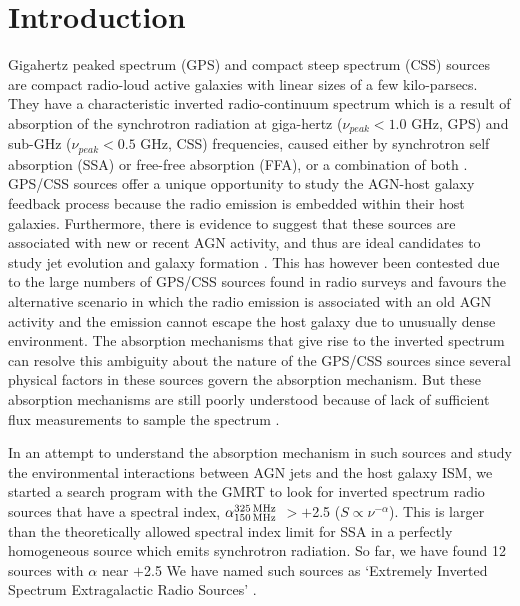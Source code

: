 \documentclass[proof]{WileyASNA-v1}
\begin{document}
\section{Introduction}\label{sec1}
Gigahertz peaked spectrum (GPS) and compact steep spectrum (CSS) sources are compact radio-loud active galaxies with linear sizes of a few kilo-parsecs. They have a characteristic inverted radio-continuum spectrum which is a result of absorption of the synchrotron radiation at giga-hertz ($\nu_{peak} < 1.0$ GHz, GPS) and sub-GHz ($\nu_{peak} < 0.5$ GHz, CSS) frequencies, caused either by synchrotron self absorption (SSA) or free-free absorption (FFA), or a combination of both \citep[e.g.,][]{Odea1998}. GPS/CSS sources offer a unique opportunity to study the AGN-host galaxy feedback process because the radio emission is embedded within their host galaxies. Furthermore, there is evidence to suggest that these sources are associated with new or recent AGN activity, and thus are ideal candidates to study jet evolution and galaxy formation \citep{Odea1998, Odea2021}. This has however been contested due to the large numbers of GPS/CSS sources found in radio surveys and favours the alternative scenario in which the radio emission is associated with an old AGN activity and the emission cannot escape the host galaxy due to unusually dense environment. The absorption mechanisms that give rise to the inverted spectrum can resolve this ambiguity about the nature of the GPS/CSS sources since several physical factors in these sources govern the absorption mechanism. But these absorption mechanisms are still poorly understood because of lack of sufficient flux measurements to sample the spectrum %
\citep{Odea1998, Callingham2017}.

In an attempt to understand the absorption mechanism in such sources and study the environmental interactions between AGN jets and the host galaxy ISM, we started a search program with the GMRT to look for inverted spectrum radio sources that have a spectral index, $\alpha^{\rm 325\, MHz}_{\rm 150\, MHz}$ $>+$2.5 ($S\propto\nu^{-\alpha}$). 
This is larger than the theoretically allowed spectral index limit for SSA in a perfectly homogeneous source which emits synchrotron radiation. So far, we have found 12 sources with $\alpha$ near $+$2.5 We have named such sources as `Extremely Inverted Spectrum Extragalactic Radio Sources' \citep[EISERS;][]{Mhaskey2019a,Mhaskey2019b, Mhaskey2020}.
\end{document}
